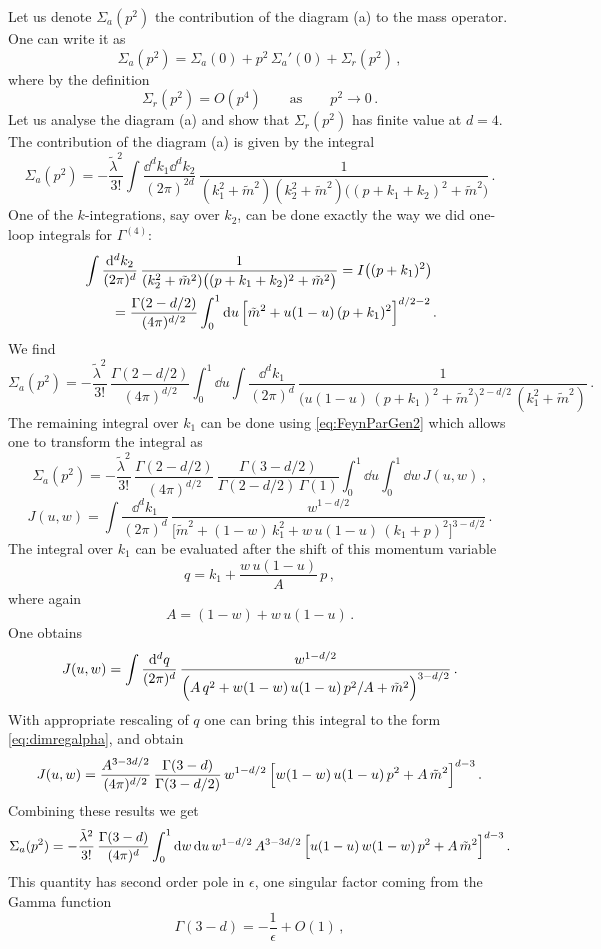 Let us denote $\Sigma_a(p^2)$ the contribution of the diagram (a) to the mass
operator. One can write it as
\[
\Sigma_a(p^2)=\Sigma_a(0)+p^2\,\Sigma_a'(0)+\Sigma_r(p^2)\,,
\]
where by the definition
\[
\Sigma_r(p^2)=O(p^4)\qquad\text{as}\qquad p^2\to0\,.
\]
Let us analyse the diagram (a) and show that $\Sigma_r(p^2)$ has finite value at
$d=4$. The contribution of the diagram (a) is given by the integral
\[
\Sigma_a(p^2)=-\frac{\tilde\lambda^2}{3!}\int\frac{\dd^dk_1\dd^dk_2}{(2\pi)^{2d}}\,\frac1{(k_1^2+\tilde m^2)(k_2^2+\tilde m^2)\bigl((p+k_1+k_2)^2+\tilde m^2\bigr)}\,.
\]
One of the $k$-integrations, say over $k_2$, can be done exactly the way we did
one-loop integrals for $\Gamma^{(4)}$:
\begin{align*}
&\int\frac{\mathop{}\!\mathrm{d}^dk_2}{(2\pi)^d}\,\frac1{(k_2^2+\tilde m^2)\bigl((p+k_1+k_2)^2+\tilde m^2\bigr)}=I\bigl((p+k_1)^2\bigr)\\
&\qquad=\frac{\Gamma(2-d/2)}{(4\pi)^{d/2}}\int_0^1\mathop{}\!\mathrm{d} u\,\Bigl[\tilde m^2+u(1-u)\,(p+k_1)^2\Bigr]^{d/2-2}\,.
\end{align*}
We find
\[
\Sigma_a(p^2)=-\frac{\tilde\lambda^2}{3!}\,\frac{\Gamma(2-d/2)}{(4\pi)^{d/2}}\int_0^1\dd u\int\frac{\dd^dk_1}{(2\pi)^d}\,
\frac1{\bigl(u(1-u)\,(p+k_1)^2+\tilde m^2\bigr)^{2-d/2}\,(k_1^2+\tilde m^2)}\,.
\]
The remaining integral over $k_1$ can be done using \eqref{eq:FeynParGen2} which
allows one to transform the integral as
\[
\Sigma_a(p^2)=-\frac{\tilde\lambda^2}{3!}\,\frac{\Gamma(2-d/2)}{(4\pi)^{d/2}}\,\frac{\Gamma(3-d/2)}{\Gamma(2-d/2)\,\Gamma(1)}\int_0^1\dd u\int_0^1\dd w\,J(u,w)\,,
\]
\[
J(u,w)=\int\frac{\dd^dk_1}{(2\pi)^d}\,\frac{w^{1-d/2}}{\bigl[\tilde m^2+(1-w)\,k_1^2+w\,u(1-u)\,(k_1+p)^2\bigr]^{3-d/2}}\,.
\]
The integral over $k_1$ can be evaluated after the shift of this momentum
variable
\[
q=k_1+\frac{w\,u(1-u)}A\,p\,,
\]
where again
\[
A=(1-w)+w\,u(1-u)\,.
\]
One obtains
\[
J(u,w)=\int\frac{\mathop{}\!\mathrm{d}^dq}{(2\pi)^d}\,\frac{w^{1-d/2}}{\Bigl(A\,q^2+w(1-w)\,u(1-u)\,p^2/A+\tilde m^2\Bigr)^{3-d/2}}\,.
\]
With appropriate rescaling of $q$ one can bring this integral to the form
\eqref{eq:dimregalpha}, and obtain
\[
J(u,w)=\frac{A^{3-3d/2}}{(4\pi)^{d/2}}\,\frac{\Gamma(3-d)}{\Gamma(3-d/2)}\,w^{1-d/2}\,\Bigl[w(1-w)\,u(1-u)\,p^2+A\,\tilde m^2\Bigr]^{d-3}\,.
\]
Combining these results we get
\[
\Sigma_a(p^2)=-\frac{\tilde\lambda^2}{3!}\,\frac{\Gamma(3-d)}{(4\pi)^d}\int_0^1\mathop{}\!\mathrm{d} w\mathop{}\!\mathrm{d} u\,w^{1-d/2}\,A^{3-3d/2}\,\Bigl[u(1-u)\,w(1-w)\,p^2+A\,\tilde m^2\Bigr]^{d-3}\,.
\]
This quantity has second order pole in $\epsilon$, one singular factor coming
from the Gamma function
\[
\Gamma(3-d)=-\frac1\epsilon+O(1)\,,
\]
